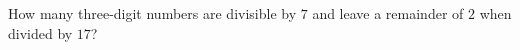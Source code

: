How many three-digit numbers are divisible by $7$ and leave a remainder of $2$ when divided by $17$?
